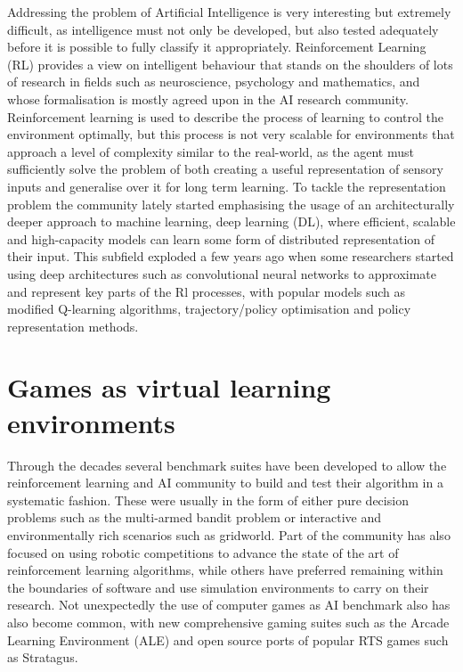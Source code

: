 \documentclass[bsc,frontabs,twoside,parskip,deptreport]{infthesis}     %
\begin{document}
Addressing the problem of Artificial Intelligence is very interesting but
extremely difficult, as intelligence must not only be developed, but also tested
adequately before it is possible to fully classify it appropriately.
Reinforcement Learning (RL) provides a view on intelligent behaviour that stands
on the shoulders of lots of research in fields such as neuroscience, psychology
and mathematics, and whose formalisation is mostly agreed upon in the AI
research community\cite{Sutton:1998:IRL:551283}. Reinforcement learning is used
to describe the process of learning to control the environment optimally, but
this process is not very scalable for environments that approach a level of
complexity similar to the real-world, as the agent must sufficiently solve the
problem of both creating a useful representation of sensory inputs and
generalise over it for long term learning. To tackle the representation problem
the community lately started emphasising the usage of an architecturally deeper
approach to machine learning, deep learning (DL), where efficient, scalable and
high-capacity models can learn some form of distributed representation of their
input\cite{lecun2015deep}. This subfield exploded a few years ago when some
researchers started using deep architectures such as convolutional neural
networks to approximate and represent key parts of the Rl processes, with
popular models such as modified Q-learning algorithms\cite{mnih2013playing},
trajectory/policy optimisation\cite{levine2015end} and policy representation
methods\cite{kakade2002approximately}.

\section{Games as virtual learning environments}

Through the decades several benchmark suites have been developed to allow the
reinforcement learning and AI community to build and test their algorithm in a
systematic fashion. These were usually in the form of either pure decision
problems such as the multi-armed bandit problem\cite{berry1985bandit} or
interactive and environmentally rich scenarios such as gridworld. Part of the
community has also focused on using robotic competitions to advance the state of
the art of reinforcement learning algorithms\cite{stone2001scaling}, while
others have preferred remaining within the boundaries of software and use
simulation environments to carry on their research\cite{gosavi2014simulation}.
Not unexpectedly the use of computer games as AI benchmark also has also become
common, with new comprehensive gaming suites such as the Arcade Learning
Environment (ALE)\cite{bellemare2012arcade} and open source ports of popular
RTS games such as Stratagus\cite{ponsen2005stratagus}.
\end{document}
